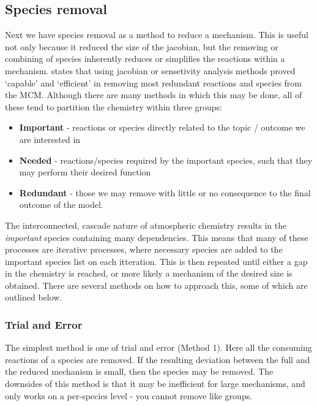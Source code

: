 \subsection{Species removal}
Next we have species removal as a method to reduce a mechanism. This is useful not only because it reduced the size of the jacobian, but the removing or combining of species inherently reduces or simplifies the reactions within a mechanism. \cite{whitehouse1} states that using jacobian or sensetivity analysis methods proved `capable' and `efficient' in removing most redundant reactions and species from the MCM. Although there are many methods in which this may be done, all of these tend to partition the chemistry within three groups:


\begin{itemize}
    \item \textbf{Important} - reactions or species directly related to the topic / outcome we are interested in
    \item \textbf{Needed} - reactions/species required by the important species, such that they may perform their desired function
    \item \textbf{Redundant} - those we may remove with little or no consequence to the final outcome of the model. 
\end{itemize}



The interconnected, cascade nature of atmospheric chemistry results in the \emph{important} species containing many dependencies. This means that many of these processes are iterative processes, where necessary species are added to the important species list on each itteration. This is then repeated until either a gap in the chemistry is reached, or more likely a mechanism of the desired size is obtained. There are several methods on how to approach this, some of which are outlined below. 

\subsubsection{Trial and Error}
The simplest method is one of trial and error \cite{tur1990} (Method 1). Here all the consuming reactions of a species are removed. If the resulting deviation between the full and the reduced mechanism is small, then the species may be removed. The downsides of this method is that it may be inefficient for large mechanisms, and only works on a per-species level - you cannot remove like groups. 

